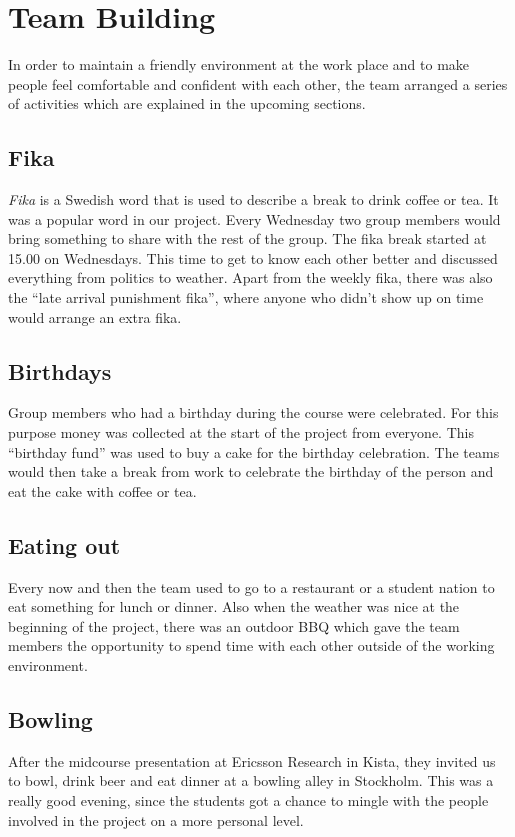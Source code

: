 \section{Team Building}

In order to maintain a friendly environment at the work place and to make people
feel comfortable and confident with each other, the team arranged a series of activities which are explained in the upcoming sections.

\subsection{Fika}
\textit{Fika} is a Swedish word that is used to describe a break to drink coffee or tea. It was a popular word in our project. Every Wednesday two group members would bring something to share with the rest of the group. The fika break started at 15.00 
on Wednesdays. This time to get to know each other better and discussed 
everything from politics to weather. Apart from the weekly fika, there was also the ``late arrival punishment fika'',
where anyone who didn't show up on time would arrange an extra fika.

\subsection{Birthdays}
Group members who had a birthday during the course were celebrated. For this purpose 
money was collected at the start of the project from everyone. This ``birthday fund'' was used to buy a cake for the birthday celebration. 
The teams would then take a break from work to celebrate the birthday of the person and eat the cake with coffee or tea. 

\subsection{Eating out}
Every now and then the team used to go to a restaurant or a student nation to eat something for lunch or dinner. Also when the weather 
was nice at the beginning of the project, there was an outdoor BBQ which gave the team members the opportunity to spend time with each
other outside of the working environment.

\subsection{Bowling}
After the midcourse presentation at Ericsson Research in Kista, they invited us to bowl, drink beer and eat dinner at a bowling alley in Stockholm. This was a really good evening, since the students got a chance to mingle with the people involved in the project on a more personal level.
